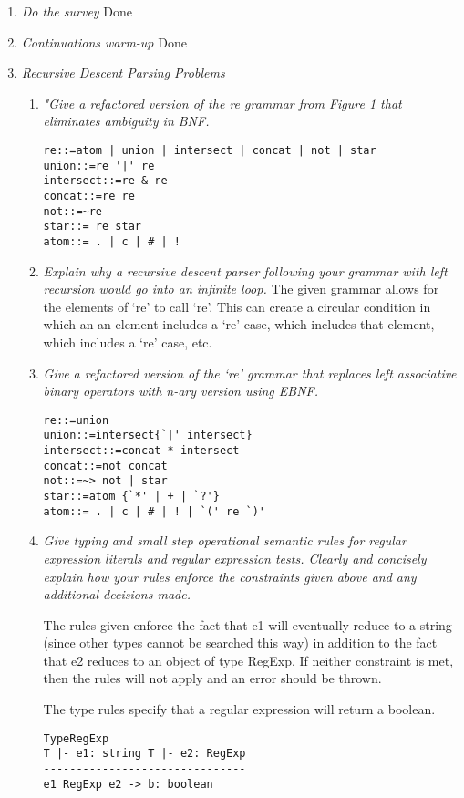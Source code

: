 \documentclass[12pt,letterpaper]{article}
\begin{document}
\begin{enumerate}
\item \textit{Do the survey}
Done

\item \textit{Continuations warm-up}
Done

\item \textit{Recursive Descent Parsing Problems}
\begin{enumerate}
\item \textit{"Give a refactored version of the re grammar from Figure 1 that eliminates ambiguity in BNF.}
\begin{verbatim}
re::=atom | union | intersect | concat | not | star
union::=re '|' re
intersect::=re & re
concat::=re re
not::=~re
star::= re star
atom::= . | c | # | !
\end{verbatim}

\item \textit{Explain why a recursive descent parser following your grammar with left recursion would go into an infinite loop.}
The given grammar allows for the elements of `re' to call `re'. This can create a circular condition in which an an element includes a `re' case, which includes that element, which includes a `re' case, etc.

\item \textit{Give a refactored version of the `re' grammar that replaces left associative binary operators with n-ary version using EBNF.}
\begin{verbatim}
re::=union
union::=intersect{`|' intersect}
intersect::=concat * intersect
concat::=not concat
not::=~> not | star
star::=atom {`*' | + | `?'}
atom::= . | c | # | ! | `(' re `)'
\end{verbatim}

\item \textit{Give typing and small step operational semantic rules for regular expression literals and regular expression tests. Clearly and concisely explain how your rules enforce the constraints given above and any additional
decisions made.}

The rules given enforce the fact that e1 will eventually reduce to a string (since other types cannot be searched this way) in addition to the fact that e2 reduces to an object of type RegExp. If neither constraint is met, then the rules will not apply and an error should be thrown.

The type rules specify that a regular expression will return a boolean.

\begin{verbatim}
TypeRegExp
T |- e1: string T |- e2: RegExp
-------------------------------
e1 RegExp e2 -> b: boolean


\end{verbatim}
\end{enumerate}
\end{enumerate}
\end{document}
